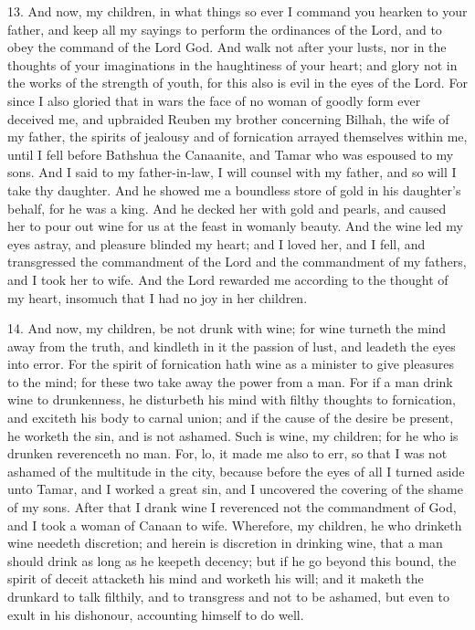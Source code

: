 13. And now, my children, in what things so ever I command you hearken to your father, and keep all my sayings to perform the ordinances of the Lord, and to obey the command of the Lord God. And walk not after your lusts, nor in the thoughts of your imaginations in the haughtiness of your heart; and glory not in the works of the strength of youth, for this also is evil in the eyes of the Lord. For since I also gloried that in wars the face of no woman of goodly form ever deceived me, and upbraided Reuben my brother concerning Bilhah, the wife of my father, the spirits of jealousy and of fornication arrayed themselves within me, until I fell before Bathshua the Canaanite, and Tamar who was espoused to my sons. And I said to my father-in-law, I will counsel with my father, and so will I take thy daughter. And he showed me a boundless store of gold in his daughter’s behalf, for he was a king. And he decked her with gold and pearls, and caused her to pour out wine for us at the feast in womanly beauty. And the wine led my eyes astray, and pleasure blinded my heart; and I loved her, and I fell, and transgressed the commandment of the Lord and the commandment of my fathers, and I took her to wife. And the Lord rewarded me according to the thought of my heart, insomuch that I had no joy in her children.

14. And now, my children, be not drunk with wine; for wine turneth the mind away from the truth, and kindleth in it the passion of lust, and leadeth the eyes into error. For the spirit of fornication hath wine as a minister to give pleasures to the mind; for these two take away the power from a man. For if a man drink wine to drunkenness, he disturbeth his mind with filthy thoughts to fornication, and exciteth his body to carnal union; and if the cause of the desire be present, he worketh the sin, and is not ashamed. Such is wine, my children; for he who is drunken reverenceth no man. For, lo, it made me also to err, so that I was not ashamed of the multitude in the city, because before the eyes of all I turned aside unto Tamar, and I worked a great sin, and I uncovered the covering of the shame of my sons. After that I drank wine I reverenced not the commandment of God, and I took a woman of Canaan to wife. Wherefore, my children, he who drinketh wine needeth discretion; and herein is discretion in drinking wine, that a man should drink as long as he keepeth decency; but if he go beyond this bound, the spirit of deceit attacketh his mind and worketh his will; and it maketh the drunkard to talk filthily, and to transgress and not to be ashamed, but even to exult in his dishonour, accounting himself to do well.


